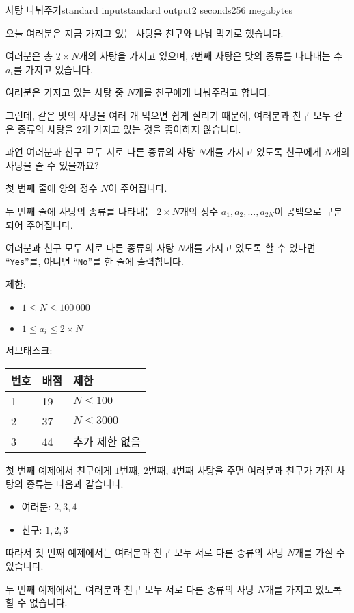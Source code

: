 \begin{problem}{사탕 나눠주기}{standard input}{standard output}{2 seconds}{256 megabytes}

오늘 여러분은 지금 가지고 있는 사탕을 친구와 나눠 먹기로 했습니다.

여러분은 총 $2\times N$개의 사탕을 가지고 있으며, $i$번째 사탕은 맛의 종류를 나타내는 수 $a_i$를 가지고 있습니다.

여러분은 가지고 있는 사탕 중 $N$개를 친구에게 나눠주려고 합니다.

그런데, 같은 맛의 사탕을 여러 개 먹으면 쉽게 질리기 때문에, 여러분과 친구 모두 같은 종류의 사탕을 $2$개 가지고 있는 것을 좋아하지 않습니다.

과연 여러분과 친구 모두 서로 다른 종류의 사탕 $N$개를 가지고 있도록 친구에게 $N$개의 사탕을 줄 수 있을까요?

\InputFile
첫 번째 줄에 양의 정수 $N$이 주어집니다.

두 번째 줄에 사탕의 종류를 나타내는 $2 \times N$개의 정수 $a_1,a_2,\ldots,a_{2N}$이 공백으로 구분되어 주어집니다.

\OutputFile
여러분과 친구 모두 서로 다른 종류의 사탕 $N$개를 가지고 있도록 할 수 있다면 ``\texttt{Yes}''를, 아니면 ``\texttt{No}''를 한 줄에 출력합니다.

\Scoring
제한:

\begin{itemize}
\item $1 \le N \le 100\,000$
\item $1 \le a_i \le 2\times N$
\end{itemize}

서브태스크:


\begin{tabular}{|l|l|l|} \hline
  \textbf{번호} & \textbf{배점} & \textbf{제한} \\ \hline
  1 & 19 & $N \le 100$ \\ \hline
  2 & 37 & $N \le 3000$ \\ \hline
  3 & 44 & 추가 제한 없음 \\ \hline
\end{tabular}

\Examples

\begin{example}
%
%
\end{example}

\Note
첫 번째 예제에서 친구에게 $1$번째, $2$번째, $4$번째 사탕을 주면 여러분과 친구가 가진 사탕의 종류는 다음과 같습니다.

\begin{itemize}
\item 여러분: $2,3,4$
\item 친구: $1,2,3$
\end{itemize}

따라서 첫 번째 예제에서는 여러분과 친구 모두 서로 다른 종류의 사탕 $N$개를 가질 수 있습니다.

두 번째 예제에서는 여러분과 친구 모두 서로 다른 종류의 사탕 $N$개를 가지고 있도록 할 수 없습니다.

\end{problem}

